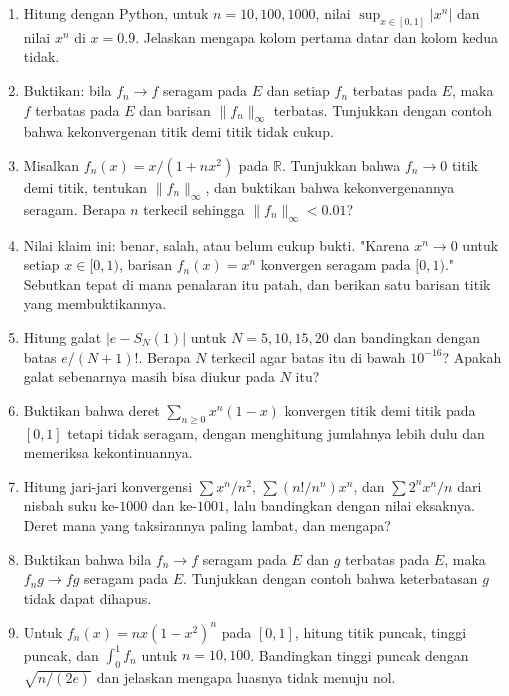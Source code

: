 \begin{latihan}
\begin{enumerate}
\item Hitung dengan Python, untuk $n=10,100,1000$, nilai
      $\sup_{x\in[0,1]}|x^n|$ dan nilai $x^n$ di $x=0.9$. Jelaskan mengapa
      kolom pertama datar dan kolom kedua tidak.

\item Buktikan: bila $f_n\to f$ seragam pada $E$ dan setiap $f_n$ terbatas pada
      $E$, maka $f$ terbatas pada $E$ dan barisan $\|f_n\|_\infty$ terbatas.
      Tunjukkan dengan contoh bahwa kekonvergenan titik demi titik tidak cukup.

\item Misalkan $f_n(x)=x/(1+nx^2)$ pada $\mathbb{R}$. Tunjukkan bahwa
      $f_n\to0$ titik demi titik, tentukan $\|f_n\|_\infty$, dan buktikan bahwa
      kekonvergenannya seragam. Berapa $n$ terkecil sehingga
      $\|f_n\|_\infty<0.01$?

\item Nilai klaim ini: benar, salah, atau belum cukup bukti. "Karena $x^n\to0$
      untuk setiap $x\in[0,1)$, barisan $f_n(x)=x^n$ konvergen seragam pada
      $[0,1)$." Sebutkan tepat di mana penalaran itu patah, dan berikan satu
      barisan titik yang membuktikannya.

\item Hitung galat $|e-S_N(1)|$ untuk $N=5,10,15,20$ dan bandingkan dengan
      batas $e/(N+1)!$. Berapa $N$ terkecil agar batas itu di bawah
      $10^{-16}$? Apakah galat sebenarnya masih bisa diukur pada $N$ itu?

\item Buktikan bahwa deret $\sum_{n\ge0}x^n(1-x)$ konvergen titik demi titik
      pada $[0,1]$ tetapi tidak seragam, dengan menghitung jumlahnya lebih dulu
      dan memeriksa kekontinuannya.

\item Hitung jari-jari konvergensi $\sum x^n/n^2$, $\sum(n!/n^n)x^n$, dan
      $\sum 2^nx^n/n$ dari nisbah suku ke-$1000$ dan ke-$1001$, lalu bandingkan
      dengan nilai eksaknya. Deret mana yang taksirannya paling lambat, dan
      mengapa?

\item Buktikan bahwa bila $f_n\to f$ seragam pada $E$ dan $g$ terbatas pada $E$,
      maka $f_ng\to fg$ seragam pada $E$. Tunjukkan dengan contoh bahwa
      keterbatasan $g$ tidak dapat dihapus.

\item Untuk $f_n(x)=nx(1-x^2)^n$ pada $[0,1]$, hitung titik puncak, tinggi
      puncak, dan $\int_0^1f_n$ untuk $n=10,100$. Bandingkan tinggi puncak
      dengan $\sqrt{n/(2e)}$ dan jelaskan mengapa luasnya tidak menuju nol.


\end{enumerate}
\end{latihan}
